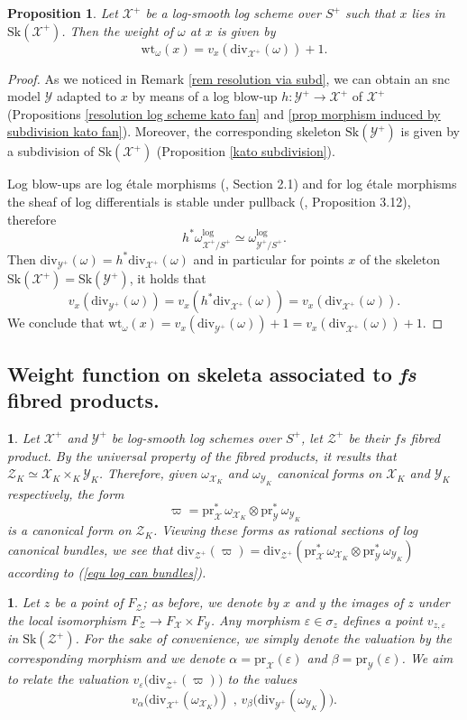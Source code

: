\documentclass{amsart}%
\numberwithin{equation}{subsection}
\theoremstyle{plain2}
\newtheorem{prop}[equation]{Proposition}
\theoremstyle{definition2}
\theoremstyle{stepstyle}
\theoremstyle{point}
\theoremstyle{subpoint}
\newtheorem{subpoint}[equation]{}%
\newcommand{\spa}[1]{\begin{subpoint}#1\end{subpoint}}           %
\newcommand{\cX}{\ensuremath{\mathscr{X}}}
\newcommand{\cY}{\ensuremath{\mathscr{Y}}}
\newcommand{\cZ}{\ensuremath{\mathscr{Z}}}
\renewcommand{\cZ}{\ensuremath{\mathscr{Z}}}
\renewcommand{\cY}{\ensuremath{\mathscr{Y}}}
\newcommand{\pr}{\mathrm{pr}}
\newcommand{\divisor}{\mathrm{div}}
\newcommand{\weight}{\mathrm{wt}}
\newcommand{\Sk}{\mathrm{Sk}}
\begin{document}
\begin{prop} \label{prop weight function log formula}
Let $\cX^+$ be a log-smooth log scheme over $S^+$ such that $x$ lies in $\Sk(\cX^+)$. Then the weight of $\omega$ at $x$ is given by $$\weight_{\omega}(x)=v_x(\divisor_{\cX^+}(\omega)) +1.$$
\end{prop}
\begin{proof}
As we noticed in Remark \ref{rem resolution via subd}, we can obtain an snc model $\cY$ adapted to $x$ by means of a log blow-up $h: \cY^+ \rightarrow \cX^+$ of $\cX^+$ (Propositions \ref{resolution log scheme kato fan} and \ref{prop morphism induced by subdivision kato fan}). Moreover, the corresponding skeleton $\Sk(\cY^+)$ is given by a subdivision of $\Sk(\cX^+)$ (Proposition \ref{kato subdivision}).

Log blow-ups are log \'{e}tale morphisms (\cite{Saito2004}, Section 2.1) and for log \'{e}tale morphisms the sheaf of log differentials is stable under pullback (\cite{Kato1994a}, Proposition 3.12), therefore $$h^* \omega_{\cX^+/ S^+}^{\text{log}} \simeq \omega_{\cY^+/S^+}^{\text{log}}.$$ Then $\divisor_{\cY^+}(\omega)=h^* \divisor_{\cX^+}(\omega)$ and in particular for points $x$ of the skeleton $\Sk(\cX^+) = \Sk(\cY^+)$, it holds that $$v_{x}(\divisor_{\cY^+}(\omega))= v_{x}(h^*\divisor_{\cX^+}(\omega))= v_x(\divisor_{\cX^+}(\omega)).$$ We conclude that $\weight_{\omega}(x)=v_x(\divisor_{\cY^+}(\omega)) +1 =   v_x(\divisor_{\cX^+}(\omega)) +1$.
\end{proof}

\subsection{Weight function on skeleta associated to \textit{fs} fibred products.} \label{paragraph weight function product}
\spa{Let $\cX^+$ and $\cY^+$ be log-smooth log schemes over $S^+$, let $\cZ^+$ be their $fs$ fibred product. By the universal property of the fibred products, it results that $\cZ_K \simeq \cX_K \times_K \cY_K$. Therefore, given $\omega_{\cX_K}$ and $\omega_{\cY_K}$ canonical forms on $\cX_K$ and $\cY_K$ respectively, the form $$\varpi=\pr_{\cX}^* \,\omega_{\cX_K} \otimes \pr_{\cY}^* \,\omega_{\cY_K}$$ is a canonical form on $\cZ_K$. Viewing these forms as rational sections of log canonical bundles, we see that $\divisor_{\cZ^+}(\varpi)=\divisor_{\cZ^+}( \pr_{\cX}^* \,\omega_{\cX_K} \otimes \pr_{\cY}^* \,\omega_{\cY_K})$ according to (\ref{equ log can bundles}).}

\spa{Let $z$ be a point of $F_{\cZ}$; as before, we denote by $x$ and $y$ the images of $z$ under the local isomorphism $F_{\cZ} \rightarrow F_{\cX} \times F_{\cY}$. Any morphism $\varepsilon \in \sigma_z$ defines a point $v_{z,\varepsilon}$ in $\Sk(\cZ^+)$. For the sake of convenience, we simply denote the valuation by the corresponding morphism and we denote $\alpha= \pr_{\cX}(\varepsilon)$ and $\beta=\pr_{\cY}(\varepsilon)$. We aim to relate the valuation $v_{\varepsilon}\big(\divisor_{\cZ^+}(\varpi)\big)$ to the values $$v_{\alpha}\big(\divisor_{\cX^+}(\omega_{\cX_K}\big)) \text{ , } v_{\beta}\big(\divisor_{\cY^+}(\omega_{\cY_K})\big).$$}
\end{document}
